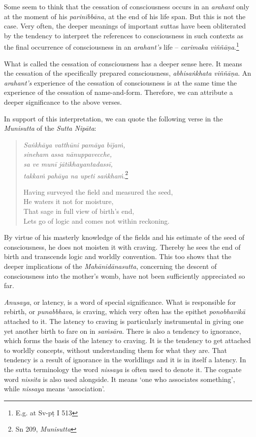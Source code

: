 Some seem to think that the cessation of consciousness occurs in an \emph{arahant} only at the moment of his \emph{parinibbāna}, at the end of his life span. But this is not the case. Very often, the deeper meanings of important suttas have been obliterated by the tendency to interpret the references to consciousness in such contexts as the final occurrence of consciousness in an \emph{arahant's} life -- \emph{carimaka viññāṇa}.\footnote{E.g. at Sv-pṭ I 513}

What is called the cessation of consciousness has a deeper sense here. It means the cessation of the specifically prepared consciousness, \emph{abhisaṅkhata viññāṇa}. An \emph{arahant's} experience of the cessation of consciousness is at the same time the experience of the cessation of name-and-form. Therefore, we can attribute a deeper significance to the above verses.

In support of this interpretation, we can quote the following verse in the \emph{Munisutta} of the \emph{Sutta Nipāta}:

\begin{quote}
\emph{Saṅkhāya vatthūni pamāya bījaṁ,}\\
\emph{sineham assa nānuppavecche,}\\
\emph{sa ve munī jātikhayantadassī,}\\
\emph{takkaṁ pahāya na upeti saṅkhaṁ}.\footnote{Sn 209, \emph{Munisutta}}

Having surveyed the field and measured the seed,\\
He waters it not for moisture,\\
That sage in full view of birth's end,\\
Lets go of logic and comes not within reckoning.
\end{quote}

By virtue of his masterly knowledge of the fields and his estimate of the seed of consciousness, he does not moisten it with craving. Thereby he sees the end of birth and transcends logic and worldly convention. This too shows that the deeper implications of the \emph{Mahānidānasutta}, concerning the descent of consciousness into the mother's womb, have not been sufficiently appreciated so far.

\emph{Anusaya}, or latency, is a word of special significance. What is responsible for rebirth, or \emph{punabbhava}, is craving, which very often has the epithet \emph{ponobhavikā} attached to it. The latency to craving is particularly instrumental in giving one yet another birth to fare on in \emph{saṁsāra}. There is also a tendency to ignorance, which forms the basis of the latency to craving. It is the tendency to get attached to worldly concepts, without understanding them for what they are. That tendency is a result of ignorance in the worldlings and it is in itself a latency. In the sutta terminology the word \emph{nissaya} is often used to denote it. The cognate word \emph{nissita} is also used alongside. It means `one who associates something', while \emph{nissaya} means `association'.

